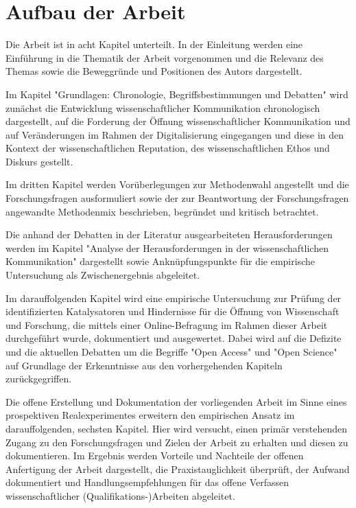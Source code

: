 \section{Aufbau der Arbeit}

Die Arbeit ist in acht Kapitel unterteilt. In der Einleitung werden eine Einführung in die Thematik der Arbeit vorgenommen und die Relevanz des Themas sowie die Beweggründe und Positionen des Autors dargestellt.

Im Kapitel "Grundlagen: Chronologie, Begriffsbestimmungen und Debatten" wird zunächst die Entwicklung wissenschaftlicher Kommunikation chronologisch dargestellt, auf die Forderung der Öffnung wissenschaftlicher Kommunikation und auf Veränderungen im Rahmen der Digitalisierung eingegangen und diese in den Kontext der wissenschaftlichen Reputation, des wissenschaftlichen Ethos und Diskurs gestellt.

Im dritten Kapitel werden Vorüberlegungen zur Methodenwahl angestellt und die Forschungsfragen ausformuliert sowie der zur Beantwortung der Forschungsfragen angewandte Methodenmix beschrieben, begründet und kritisch betrachtet.

Die anhand der Debatten in der Literatur ausgearbeiteten Herausforderungen werden im Kapitel "Analyse der Herausforderungen in der wissenschaftlichen Kommunikation" dargestellt sowie Anknüpfungspunkte für die empirische Untersuchung als Zwischenergebnis abgeleitet.

Im darauffolgenden Kapitel wird eine empirische Untersuchung zur Prüfung der identifizierten Katalysatoren und Hindernisse für die Öffnung von Wissenschaft und Forschung, die mittels einer Online-Befragung im Rahmen dieser Arbeit durchgeführt wurde, dokumentiert und ausgewertet. Dabei wird auf die Defizite und die aktuellen Debatten um die Begriffe "Open Access" und "Open Science" auf Grundlage der Erkenntnisse aus den vorhergehenden Kapiteln zurückgegriffen.

Die offene Erstellung und Dokumentation der vorliegenden Arbeit im Sinne eines prospektiven Realexperimentes erweitern den empirischen Ansatz im darauffolgenden, sechsten Kapitel. Hier wird versucht, einen primär verstehenden Zugang zu den Forschungsfragen und Zielen der Arbeit zu erhalten und diesen zu dokumentieren. Im Ergebnis werden Vorteile und Nachteile der offenen Anfertigung der Arbeit dargestellt, die Praxistauglichkeit überprüft, der Aufwand dokumentiert und Handlungsempfehlungen für das offene Verfassen wissenschaftlicher (Qualifikations-)Arbeiten abgeleitet.

